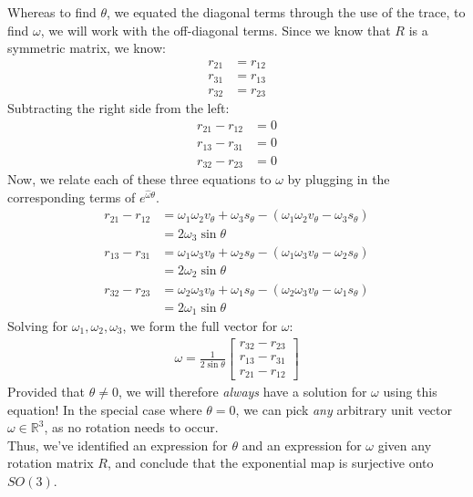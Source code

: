 \documentclass[oneside]{book}
\begin{document}
Whereas to find $\theta$, we equated the diagonal terms through the use of the trace, to find $\omega$, we will work with the off-diagonal terms. Since we know that $R$ is a symmetric matrix, we know:
\begin{align}
    r_{21} &= r_{12}\\
    r_{31} &= r_{13}\\
    r_{32} &= r_{23}
\end{align}
Subtracting the right side from the left:
\begin{align}
    r_{21} - r_{12} &= 0\\
    r_{13} - r_{31} &= 0\\
    r_{32} - r_{23} &= 0
\end{align}
Now, we relate each of these three equations to $\omega$ by plugging in the corresponding terms of $e^{\hat\omega\theta}$.
\begin{align}
    r_{21} - r_{12} &= \omega_1\omega_2v_\theta+\omega_3s_\theta - (\omega_1\omega_2v_\theta-\omega_3s_\theta)\\
    &= 2\omega_3\sin\theta\\
    r_{13} - r_{31} &= \omega_1\omega_3v_\theta+\omega_2s_\theta - (\omega_1\omega_3v_\theta-\omega_2s_\theta)\\
    &= 2\omega_2\sin\theta\\
    r_{32} - r_{23} &= \omega_2\omega_3v_\theta+\omega_1s_\theta - (\omega_2\omega_3v_\theta-\omega_1s_\theta)\\
    &= 2\omega_1\sin\theta
\end{align}
Solving for $\omega_1, \omega_2, \omega_3$, we form the full vector for $\omega$:
\begin{align}
    \omega = 
    \frac{1}{2\sin\theta}
    \begin{bmatrix}
    r_{32} - r_{23}\\
    r_{13} - r_{31}\\
    r_{21} - r_{12}
    \end{bmatrix}
\end{align}
Provided that $\theta \neq 0$, we will therefore \textit{always} have a solution for $\omega$ using this equation! In the special case where $\theta = 0$, we can pick \textit{any} arbitrary unit vector $\omega \in \mathbb{R}^3$, as no rotation needs to occur.\\
Thus, we've identified an expression for $\theta$ and an expression for $\omega$ given any rotation matrix $R$, and conclude that the exponential map is surjective onto $SO(3)$.\\
\end{document}
